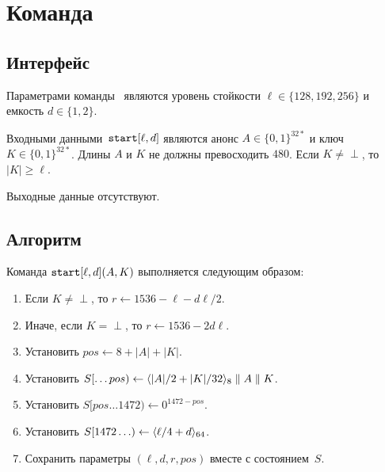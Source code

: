 \section{Команда }\label{PRG.Start}

\subsection{Интерфейс}\label{PRG.Start.IFace}

Параметрами команды~ являются уровень стойкости 
$\ell\in\{128,192,256\}$ и емкость $d\in\{1,2\}$.

Входными данными~$\texttt{start}[\ell,d]$ являются анонс $A\in\{0,1\}^{32*}$
и ключ $K\in\{0,1\}^{32*}$. Длины $A$ и $K$ не должны превосходить $480$.
Если $K\neq\perp$, то~$|K|\geq\ell$.

Выходные данные отсутствуют.

\subsection{Алгоритм}\label{PRG.Start.Alg}

Команда $\texttt{start}[\ell,d](A,K)$ выполняется следующим образом:
\begin{enumerate}
\item
Если $K\neq\perp$, то $r\leftarrow 1536-\ell-d\ell/2$.
\item
Иначе, если $K=\perp$, то $r\leftarrow 1536-2d\ell$.
\item
Установить
$pos\leftarrow 8+|A|+|K|$.
\item
Установить
$S[\dots pos)\leftarrow 
\langle|A|/2+|K|/32\rangle_8\parallel A\parallel K$.
\item
Установить
$S[pos\dots 1472)\leftarrow 0^{1472-pos}$.
\item
Установить
$S[1472\ldots)\leftarrow\langle\ell/4+d\rangle_{64}$.
\item
Сохранить параметры $(\ell, d, r, pos)$ вместе с состоянием~$S$.
\end{enumerate}

